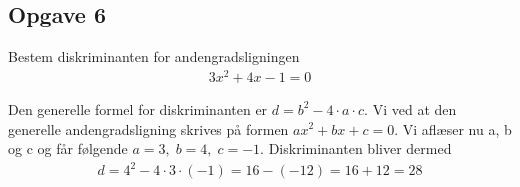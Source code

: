 \subsection{Opgave 6}

Bestem diskriminanten for andengradsligningen
\begin{align*}
    3x^2 + 4x -1 = 0
\end{align*}

\ans

Den generelle formel for diskriminanten er $d = b^2 - 4\cdot a\cdot c$. Vi ved at den generelle andengradsligning skrives på formen $ax^2 + bx + c = 0$. Vi aflæser nu a, b og c og får følgende $a = 3,\; b = 4,\; c = -1$. Diskriminanten bliver dermed
\begin{align*}
    d = 4^2 -4\cdot 3\cdot (-1) = 16 - (-12) = 16 + 12 = 28
\end{align*}
